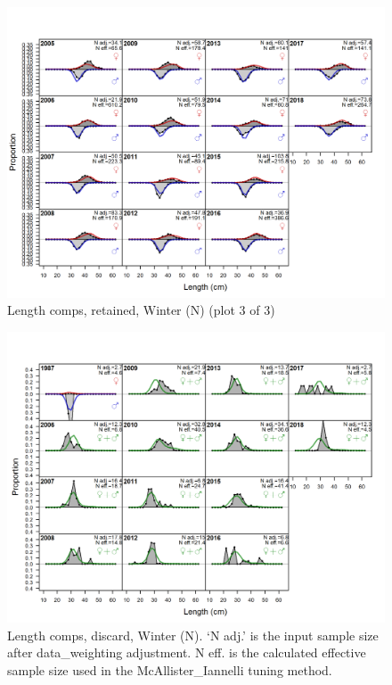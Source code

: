 \documentclass[12pt,]{article}
\begin{document}
\begin{figure}
\centering
\includegraphics{r4ss/plots_mod1/comp_lenfit_flt1mkt2_page3.png}
\caption{Length comps, retained, Winter (N) (plot 3 of 3)
\label{fig:length_fits}}
\end{figure}

\begin{figure}
\centering
\includegraphics{r4ss/plots_mod1/comp_lenfit_flt1mkt1.png}
\caption{Length comps, discard, Winter (N). `N adj.' is the input sample
size after data\_weighting adjustment. N eff. is the calculated
effective sample size used in the McAllister\_Iannelli tuning method.
\label{fig:length_fits}}
\end{figure}
\end{document}
